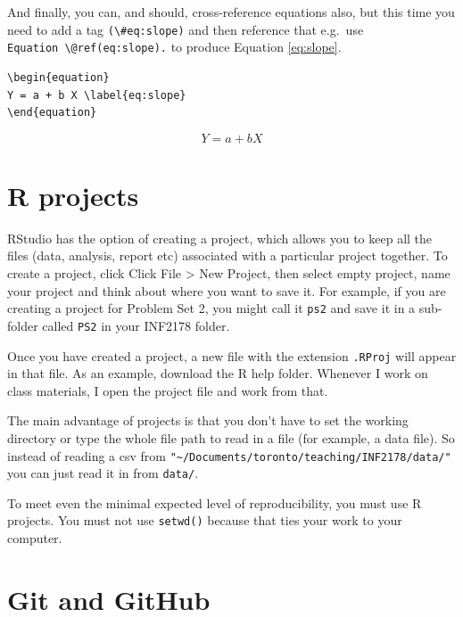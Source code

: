\documentclass[
]{book}
\begin{document}
And finally, you can, and should, cross-reference equations also, but this time you need to add a tag \texttt{(\textbackslash{}\#eq:slope)} and then reference that e.g.~use \texttt{Equation\ \textbackslash{}@ref(eq:slope).} to produce Equation \eqref{eq:slope}.

\begin{verbatim}
\begin{equation}
Y = a + b X \label{eq:slope}
\end{equation}
\end{verbatim}

\begin{equation}
Y = a + b X \label{eq:slope}
\end{equation}

\hypertarget{r-projects}{%
\section{R projects}\label{r-projects}}

RStudio has the option of creating a project, which allows you to keep all the files (data, analysis, report etc) associated with a particular project together. To create a project, click Click File \textgreater{} New Project, then select empty project, name your project and think about where you want to save it. For example, if you are creating a project for Problem Set 2, you might call it \texttt{ps2} and save it in a sub-folder called \texttt{PS2} in your INF2178 folder.

Once you have created a project, a new file with the extension \texttt{.RProj} will appear in that file. As an example, download the R help folder. Whenever I work on class materials, I open the project file and work from that.

The main advantage of projects is that you don't have to set the working directory or type the whole file path to read in a file (for example, a data file). So instead of reading a csv from \texttt{"\textasciitilde{}/Documents/toronto/teaching/INF2178/data/"} you can just read it in from \texttt{data/}.

To meet even the minimal expected level of reproducibility, you must use R projects. You must not use \texttt{setwd()} because that ties your work to your computer.

\hypertarget{git-and-github}{%
\section{Git and GitHub}\label{git-and-github}}
\end{document}
